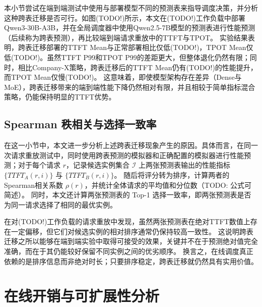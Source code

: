 本小节尝试在端到端测试中使用与部署模型不同的预测表来指导调度决策，并分析这种跨表迁移是否可行。如图(TODO!)所示，本文在(TODO!)工作负载中部署Qwen3-30B-A3B，并在全局调度器中使用Qwen2.5-7B模型的预测表进行性能预测（后续称为跨表预测），再比较端到端请求重放中的TTFT与TPOT。
实验结果表明，跨表迁移部署的TTFT Mean与正常部署相比仅低(TODO!)，TPOT Mean仅低(TODO!)。虽然TTFT P99和TPOT P99的差距更大，但整体退化仍然有限；同时，相比Company-X策略，跨表迁移后的TTFT Mean仍有(TODO!)的性能提升，而TPOT Mean仅慢(TODO!)。
这意味着，即使模型架构存在差异（Dense与MoE），跨表迁移带来的端到端性能下降仍然相对有限，并且相较于简单指标混合策略，仍能保持明显的TTFT优势。


\subsection{Spearman 秩相关与选择一致率}
\label{sec:spearman}

在这一小节中，本文进一步分析上述跨表迁移现象产生的原因。具体而言，在同一次请求重放测试中，同时使用跨表预测的模拟器和正确配置的模拟器进行性能预测；对于每个请求 $r$，记录候选实例集合 $\mathcal{I}$ 上两张预测表输出的性能指标 $\{TTFT_A(r,i)\}$ 与 $\{TTFT_B(r,i)\}$。
随后将评分转为排序，计算两者的Spearman相关系数 $\rho(r)$，并统计全体请求的平均值和分位数（TODO: 公式可简述）。
同时，本文还计算两张预测表的 Top-1 选择一致率，即两张预测表是否为同一请求选择了相同的最优实例。

在对(TODO!)工作负载的请求重放中发现，虽然两张预测表在绝对TTFT数值上存在一定偏移，但它们对候选实例的相对排序通常仍保持较高一致性。
这说明跨表迁移之所以能够在端到端实验中取得可接受的效果，关键并不在于预测绝对值完全准确，而在于其仍能较好保留不同实例之间的优劣顺序。
换言之，在线调度真正依赖的是排序信息而非绝对时长；只要排序稳定，跨表迁移就仍然具有实用价值。
\section{在线开销与可扩展性分析}
\label{sec:online_budget}

